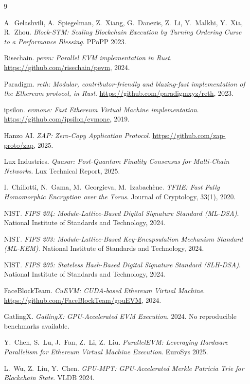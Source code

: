 \documentclass[11pt]{article}
\begin{document}
\begin{thebibliography}{9}

A.~Gelashvili, A.~Spiegelman, Z.~Xiang, G.~Danezis, Z.~Li, Y.~Malkhi, Y.~Xia, R.~Zhou.
\emph{Block-STM: Scaling Blockchain Execution by Turning Ordering Curse to a Performance Blessing}.
PPoPP 2023.

Risechain.
\emph{pevm: Parallel EVM implementation in Rust}.
\url{https://github.com/risechain/pevm}, 2024.

Paradigm.
\emph{reth: Modular, contributor-friendly and blazing-fast implementation of the Ethereum protocol, in Rust}.
\url{https://github.com/paradigmxyz/reth}, 2023.

ipsilon.
\emph{evmone: Fast Ethereum Virtual Machine implementation}.
\url{https://github.com/ipsilon/evmone}, 2019.

Hanzo AI.
\emph{ZAP: Zero-Copy Application Protocol}.
\url{https://github.com/zap-proto/zap}, 2025.

Lux Industries.
\emph{Quasar: Post-Quantum Finality Consensus for Multi-Chain Networks}.
Lux Technical Report, 2025.

I.~Chillotti, N.~Gama, M.~Georgieva, M.~Izabach\`{e}ne.
\emph{TFHE: Fast Fully Homomorphic Encryption over the Torus}.
Journal of Cryptology, 33(1), 2020.

NIST.
\emph{FIPS 204: Module-Lattice-Based Digital Signature Standard (ML-DSA)}.
National Institute of Standards and Technology, 2024.

NIST.
\emph{FIPS 203: Module-Lattice-Based Key-Encapsulation Mechanism Standard (ML-KEM)}.
National Institute of Standards and Technology, 2024.

NIST.
\emph{FIPS 205: Stateless Hash-Based Digital Signature Standard (SLH-DSA)}.
National Institute of Standards and Technology, 2024.

FaceBlockTeam.
\emph{CuEVM: CUDA-based Ethereum Virtual Machine}.
\url{https://github.com/FaceBlockTeam/gpuEVM}, 2024.

GatlingX.
\emph{GatlingX: GPU-Accelerated EVM Execution}.
2024. No reproducible benchmarks available.

Y.~Chen, S.~Lu, J.~Fan, Z.~Li, Z.~Liu.
\emph{ParallelEVM: Leveraging Hardware Parallelism for Ethereum Virtual Machine Execution}.
EuroSys 2025.

L.~Wu, Z.~Liu, Y.~Chen.
\emph{GPU-MPT: GPU-Accelerated Merkle Patricia Trie for Blockchain State}.
VLDB 2024.

\end{thebibliography}
\end{document}
